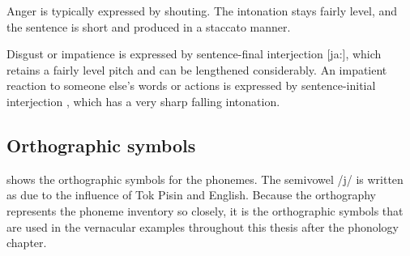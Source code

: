  


Anger is typically expressed by shouting.  The intonation stays fairly level, and the sentence is short and produced in a staccato manner.

Disgust or impatience is expressed by sentence-final interjection  [ja:], which retains a fairly level pitch and can be lengthened considerably.  An impatient reaction to someone else's words or actions is expressed by sentence-initial interjection , which has a very sharp falling intonation.







\subsection{Orthographic symbols}


 shows the orthographic symbols for the phonemes. The semivowel /j/ is written as  due to the influence of Tok Pisin and English.  Because the orthography represents the phoneme inventory so closely, it is the orthographic symbols that are used in the vernacular examples throughout this thesis after the phonology chapter.



